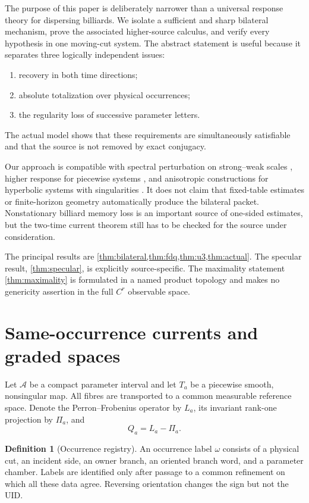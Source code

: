 \documentclass[11pt,reqno]{amsart}
\theoremstyle{definition}
\newtheorem{definition}[theorem]{Definition}
\theoremstyle{remark}
\newcommand{\A}{\mathcal A}
\begin{document}
The purpose of this paper is deliberately narrower than a universal response
theory for dispersing billiards.  We isolate a sufficient and sharp bilateral
mechanism, prove the associated higher-source calculus, and verify every
hypothesis in one moving-cut system.  The abstract statement is useful because
it separates three logically independent issues:
\begin{enumerate}[label=(\roman*)]
\item recovery in both time directions;
\item absolute totalization over physical occurrences;
\item the regularity loss of successive parameter letters.
\end{enumerate}
The actual model shows that these requirements are simultaneously satisfiable
and that the source is not removed by exact conjugacy.

Our approach is compatible with spectral perturbation on strong--weak scales
\cite{KellerLiverani1999}, higher response for piecewise systems
\cite{BaladiSmania2008}, and anisotropic constructions for hyperbolic systems
with singularities \cite{DemersLiverani2008,BaladiDemersLiverani2018}.  It does
not claim that fixed-table estimates or finite-horizon geometry automatically
produce the bilateral packet.  Nonstationary billiard memory loss
\cite{StenlundYoungZhang2013} is an important source of one-sided estimates,
but the two-time current theorem still has to be checked for the source under
consideration.

The principal results are \cref{thm:bilateral,thm:fdq,thm:u3,thm:actual}.
The specular result, \cref{thm:specular}, is explicitly source-specific.  The
maximality statement \cref{thm:maximality} is formulated in a named product
topology and makes no genericity assertion in the full $C^r$ observable space.

\section{Same-occurrence currents and graded spaces}\label{sec:setting}

Let $\A$ be a compact parameter interval and let $T_a$ be a piecewise smooth,
nonsingular map.  All fibres are transported to a common measurable reference
space.  Denote the Perron--Frobenius operator by $L_a$, its invariant rank-one
projection by $\Pi_a$, and
\[
 Q_a=L_a-\Pi_a.
\]

\begin{definition}[Occurrence registry]\label{def:registry}
An occurrence label $\omega$ consists of a physical cut, an incident side, an
owner branch, an oriented branch word, and a parameter chamber.  Labels are
identified only after passage to a common refinement on which all these data
agree.  Reversing orientation changes the sign but not the UID.
\end{definition}
\end{document}
